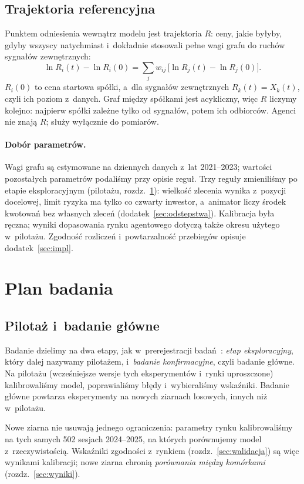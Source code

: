 \documentclass[11pt,a4paper]{article}
\begin{document}
\subsection{Trajektoria referencyjna}\label{sec:R}
Punktem odniesienia wewnątrz modelu jest trajektoria $R$: ceny, jakie byłyby, gdyby wszyscy natychmiast i~dokładnie stosowali
pełne wagi grafu do ruchów sygnałów zewnętrznych:
\begin{equation}
  \ln R_i(t) - \ln R_i(0) = \sum_{j} w_{ij}\,\bigl[\ln R_j(t) - \ln R_j(0)\bigr].
\end{equation}
$R_i(0)$ to cena startowa spółki, a~dla sygnałów zewnętrznych $R_k(t) = X_k(t)$, czyli ich poziom z~danych. Graf między spółkami jest acykliczny, więc $R$ liczymy kolejno: najpierw spółki zależne tylko od sygnałów, potem ich
odbiorców. Agenci nie znają $R$; służy wyłącznie do pomiarów.

\paragraph{Dobór parametrów.}
Wagi grafu są estymowane na dziennych danych z~lat 2021--2023; wartości pozostałych parametrów podaliśmy przy opisie
reguł. Trzy reguły zmieniliśmy po etapie eksploracyjnym (pilotażu, rozdz.~\ref{sec:plan}): wielkość zlecenia wynika z~pozycji docelowej, limit ryzyka ma tylko co
czwarty inwestor, a~animator liczy środek kwotowań bez własnych zleceń (dodatek~\ref{sec:odstepstwa}). Kalibracja
była ręczna; wyniki dopasowania rynku agentowego dotyczą także okresu użytego w~pilotażu. Zgodność rozliczeń
i~powtarzalność przebiegów opisuje dodatek~\ref{sec:impl}.

\section{Plan badania}\label{sec:plan}

\subsection{Pilotaż i~badanie główne}
Badanie dzielimy na dwa etapy, jak w~prerejestracji badań~\cite{nosek2018}: \emph{etap eksploracyjny}, który
dalej nazywamy pilotażem, i~\emph{badanie konfirmacyjne}, czyli badanie główne. Na pilotażu (wcześniejsze wersje tych eksperymentów i~rynki uproszczone)
kalibrowaliśmy model, poprawialiśmy błędy i~wybieraliśmy wskaźniki. Badanie główne powtarza eksperymenty na nowych
ziarnach losowych, innych niż w~pilotażu.

Nowe ziarna nie usuwają jednego ograniczenia: parametry rynku kalibrowaliśmy na tych samych 502 sesjach
2024--2025, na których porównujemy model z~rzeczywistością. Wskaźniki zgodności z~rynkiem (rozdz.~\ref{sec:walidacja})
są więc wynikami kalibracji; nowe ziarna chronią \emph{porównania między komórkami} (rozdz.~\ref{sec:wyniki}).
\end{document}
